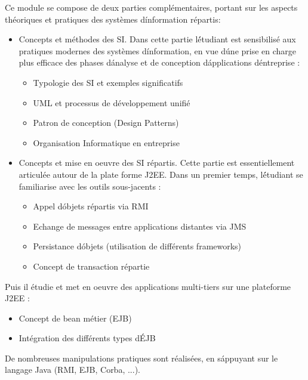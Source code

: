 {
Ce module se compose de deux parties complémentaires, portant sur les aspects théoriques et pratiques des systèmes d\'information répartis:
\begin{itemize}
\item Concepts et méthodes des SI. Dans cette partie l\'étudiant est sensibilisé aux pratiques modernes des systèmes d\'information,
en vue d\'une prise en charge plus efficace des phases d\'analyse et de conception d\'applications d\'entreprise :
  \begin{itemize}
  \item Typologie des SI et exemples significatifs
  \item UML et processus de développement unifié
  \item Patron de conception (Design Patterns)
  \item Organisation Informatique en entreprise
  \end{itemize} 
\item Concepts et mise en oeuvre des SI répartis. Cette partie est essentiellement articulée autour de la plate forme J2EE.
Dans un premier temps, l\'étudiant se familiarise avec les outils sous-jacents :
  \begin{itemize}
  \item Appel d\'objets répartis via RMI
  \item Echange de messages entre applications distantes via JMS
  \item Persistance d\'objets (utilisation de différents frameworks)
  \item Concept de transaction répartie
  \end{itemize} 
\end{itemize} 
Puis il étudie et met en oeuvre des applications multi-tiers sur une plateforme J2EE :
  \begin{itemize}
  \item Concept de bean métier (EJB)
  \item Intégration des différents types d\'EJB
  \end{itemize}
  De nombreuses manipulations pratiques sont réalisées, en s\'appuyant sur le langage Java (RMI, EJB, Corba, ...).
} 
